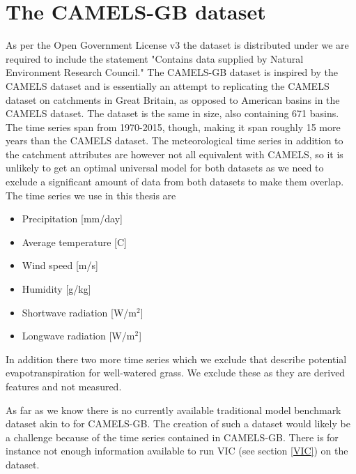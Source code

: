 \section{The CAMELS-GB dataset}
As per the Open Government License v3 the dataset is distributed under we are required 
to include the statement "Contains data supplied by Natural Environment Research Council."
The CAMELS-GB dataset \citep{CAMELS_GB} is inspired by the CAMELS dataset and is 
essentially an attempt to replicating the CAMELS dataset on catchments in Great Britain, 
as opposed to American basins in the CAMELS dataset. The dataset is the same in size,
also containing 671 basins. The time series span from 1970-2015, though, making 
it span roughly 15 more years than the CAMELS dataset.
 The meteorological time series in addition to the catchment attributes are however 
 not all equivalent with CAMELS, so it is unlikely to get an optimal universal model 
 for both datasets as we need to exclude a significant amount of data from both 
 datasets to make them overlap.
The time series we use in this thesis are
\begin{itemize}
    \item Precipitation [mm/day]
    \item Average temperature [C\degree]
    \item Wind speed [m/s]
    \item Humidity [g/kg]
    \item Shortwave radiation [W/m$^2$]
    \item Longwave radiation [W/m$^2$]
\end{itemize}
In addition there two more time series which we exclude that describe potential 
evapotranspiration for well-watered grass. We exclude these as they are derived 
features and not measured.


As far as we know there is no currently available traditional model benchmark dataset 
akin to \cite{CAMELS_hydroshare} for CAMELS-GB. The creation of such a dataset would 
likely be a challenge because of the time series contained in CAMELS-GB. There is for 
instance not enough information available to run VIC (see section \ref{VIC}) on 
the dataset.
